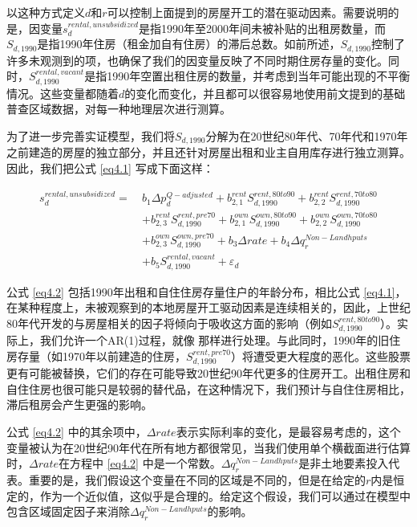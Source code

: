 \documentclass[lang=cn,11pt,a4paper]{paper}
\begin{document}
以这种方式定义$d$和$r$可以控制上面提到的房屋开工的潜在驱动因素。需要说明的是，因变量$s_{d}^{rental,unsubsidized}$是指1990年至2000年间未被补贴的出租房数量，而$S_{d,1990}$是指1990年住房（租金加自有住房）的滞后总数。如前所述，$S_{d, 1990}$控制了许多未观测到的项，也确保了我们的因变量反映了不同时期住房存量的变化。同时，$S_{d, 1990}^{rental, vacant}$是指1990年空置出租住房的数量，并考虑到当年可能出现的不平衡情况。这些变量都随着$d$的变化而变化，并且都可以很容易地使用前文提到的基础普查区域数据，对每一种地理层次进行测算。

为了进一步完善实证模型，我们将$S_{d,1990}$分解为在20世纪80年代、70年代和1970年之前建造的房屋的独立部分，并且还针对房屋出租和业主自用库存进行独立测算。因此，我们把公式 \eqref{eq4.1} 写成下面这样：

\begin{equation}\label{eq4.2}
\begin{aligned}
  s_{d}^{rental,unsubsidized}=\ & b_{1} \Delta p_{d}^{Q-adjusted}+b_{2,1}^{rent} S_{d, 1990}^{rent, 80 t o 90}+b_{2,2}^{rent} S_{d, 1990}^{rent, 70 to 80} \\
  &+b_{2,3}^{rent} S_{d, 1990}^{rent, pre 70}+b_{2,1}^{own} S_{d, 1990}^{own, 80 to 90}+b_{2,2}^{own} S_{d, 1990}^{own, 70 to 80} \\
  &+b_{2,3}^{own} S_{d, 1990}^{own, pre 70}+b_{3} \Delta rate+b_{4} \Delta q_{r}^{Non-Landhputs} \\
  &+b_{5} S_{d, 1990}^{rental,vacant}+\varepsilon_{d}
  \end{aligned}
\end{equation}

公式 \eqref{eq4.2} 包括1990年出租和自住住房存量住户的年龄分布，相比公式 \eqref{eq4.1}，在某种程度上，未被观察到的本地房屋开工驱动因素是连续相关的，因此，上世纪80年代开发的与房屋相关的因子将倾向于吸收这方面的影响（例如$S_{d, 1990}^{rent, 80 to 90}$）。实际上，我们允许一个AR(1)过程，就像 \cite{Mayer200085} 那样进行处理。与此同时，1990年的旧住房存量（如1970年以前建造的住房，$S_{d, 1990}^{rent, pre70}$）将遭受更大程度的恶化。这些股票更有可能被替换，它们的存在可能导致20世纪90年代更多的住房开工。出租住房和自住住房也很可能只是较弱的替代品，在这种情况下，我们预计与自住住房相比，滞后租房会产生更强的影响。

公式 \eqref{eq4.2} 中的其余项中，$\Delta rate$表示实际利率的变化，是最容易考虑的，这个变量被认为在20世纪90年代在所有地方都很常见，当我们使用单个横截面进行估算时，$\Delta rate$在方程中 \eqref{eq4.2} 中是一个常数。$\Delta q_{r}^{Non-Landhputs}$是非土地要素投入代表。重要的是，我们假设这个变量在不同的区域是不同的，但是在给定的$r$内是恒定的，作为一个近似值，这似乎是合理的。给定这个假设，我们可以通过在模型中包含区域固定因子来消除$\Delta q_{r}^{Non-Landhputs}$的影响。
\end{document}
